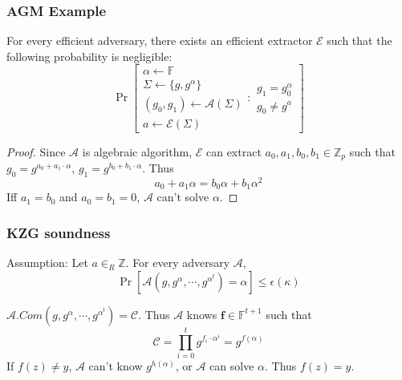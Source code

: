 \documentclass[UFT8]{beamer}
\begin{document}
\begin{frame}
	\frametitle{AGM Example}

	For every efficient adversary, there exists an efficient extractor $\mathcal{E}$ such that the following probability is negligible:
	\begin{equation*}
		\Pr\left[ \begin{aligned}
			\alpha \leftarrow \mathbb{F} \\
			\Sigma \leftarrow \{ g, g^\alpha \} \\
			(g_0, g_1) \leftarrow \mathcal{A}(\Sigma) \\
			a \leftarrow \mathcal{E}(\Sigma)
		\end{aligned}
		: \begin{aligned}
			g_1 = g_0^\alpha \\
			g_0 \neq g^a
		\end{aligned}
		\right]
	\end{equation*}

	\begin{proof}
		Since $\mathcal{A}$ is algebraic algorithm, {\color{red} $\mathcal{E}$ can extract $a_0, a_1, b_0, b_1 \in \mathbb{Z}_p$} such that $g_0 = g^{a_0 + a_1 \cdot \alpha}$, $g_1 = g^{b_0 + b_1 \cdot \alpha}$. Thus
		$$
			a_0 + a_1 \alpha = b_0 \alpha + b_1 \alpha^2
		$$
		Iff $a_1 = b_0$ and $a_0 = b_1 = 0$, $\mathcal{A}$ can't solve $\alpha$.
	\end{proof}
\end{frame}

\begin{frame}
	\frametitle{KZG soundness}
	Assumption: Let $a \in_R \mathbb{Z}$. For every adversary $\mathcal{A}$,
	\begin{equation*}
		\Pr\left[\mathcal{A}\left(g, g^\alpha, \cdots, g^{\alpha^t} \right) = \alpha \right] \le \epsilon(\kappa)
	\end{equation*}

	$\mathcal{A}.Com\left(g, g^\alpha, \cdots, g^{\alpha^t} \right) = \mathcal{C}$. Thus $\mathcal{A}$ knows $\mathbf{f} \in \mathbb{F}^{t+1}$ such that 
	$$
	\mathcal{C} = \prod_{i=0}^{t} g^{f_i \cdot \alpha^i} = g^{f(\alpha)}
	$$
	If $f(z) \neq y$, $\mathcal{A}$ can't know $g^{h(\alpha)}$, or $\mathcal{A}$ can solve $\alpha$.
	Thus $f(z) = y$.
\end{frame}
\end{document}
